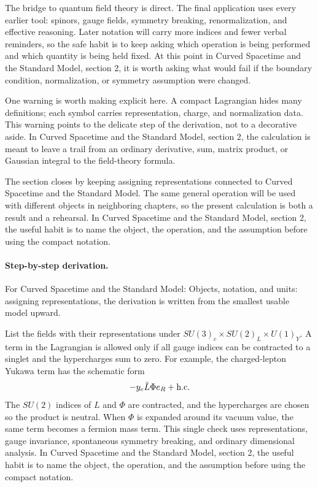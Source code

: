 The bridge to quantum field theory is direct.  The final application uses every earlier tool: spinors, gauge fields, symmetry breaking, renormalization, and effective reasoning.  Later notation will carry more indices and fewer verbal reminders, so the safe habit is to keep asking which operation is being performed and which quantity is being held fixed.  At this point in Curved Spacetime and the Standard Model, section 2, it is worth asking what would fail if the boundary condition, normalization, or symmetry assumption were changed.

One warning is worth making explicit here.  A compact Lagrangian hides many definitions; each symbol carries representation, charge, and normalization data.  This warning points to the delicate step of the derivation, not to a decorative aside.  In Curved Spacetime and the Standard Model, section 2, the calculation is meant to leave a trail from an ordinary derivative, sum, matrix product, or Gaussian integral to the field-theory formula.

The section closes by keeping assigning representations connected to Curved Spacetime and the Standard Model.  The same general operation will be used with different objects in neighboring chapters, so the present calculation is both a result and a rehearsal.  In Curved Spacetime and the Standard Model, section 2, the useful habit is to name the object, the operation, and the assumption before using the compact notation.



\paragraph{Step-by-step derivation.}

For Curved Spacetime and the Standard Model: Objects, notation, and units: assigning representations, the derivation is written from the smallest usable model upward.

List the fields with their representations under \(SU(3)_c\times SU(2)_L\times U(1)_Y\).  A term in the Lagrangian is allowed only if all gauge indices can be contracted to a singlet and the hypercharges sum to zero.  For example, the charged-lepton Yukawa term has the schematic form
\[
  -y_e\bar L\Phi e_R+\hbox{h.c.}
\]
The \(SU(2)\) indices of \(L\) and \(\Phi\) are contracted, and the hypercharges are chosen so the product is neutral.  When \(\Phi\) is expanded around its vacuum value, the same term becomes a fermion mass term.  This single check uses representations, gauge invariance, spontaneous symmetry breaking, and ordinary dimensional analysis.  In Curved Spacetime and the Standard Model, section 2, the useful habit is to name the object, the operation, and the assumption before using the compact notation.

